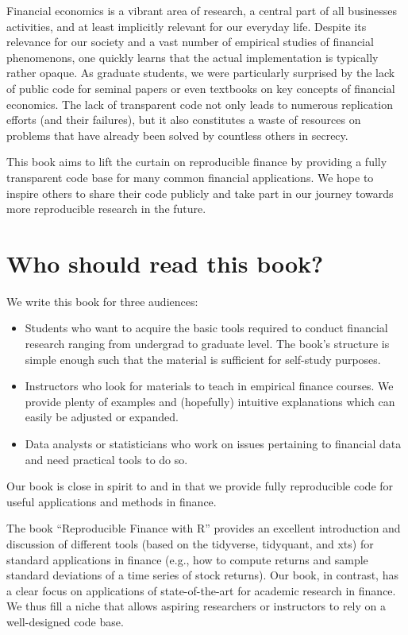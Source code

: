 \documentclass[
]{krantz}
\providecommand{\tightlist}{%
  \setlength{\itemsep}{0pt}\setlength{\parskip}{0pt}}
\begin{document}
Financial economics is a vibrant area of research, a central part of all businesses activities, and at least implicitly relevant for our everyday life. Despite its relevance for our society and a vast number of empirical studies of financial phenomenons, one quickly learns that the actual implementation is typically rather opaque.
As graduate students, we were particularly surprised by the lack of public code for seminal papers or even textbooks on key concepts of financial economics. The lack of transparent code not only leads to numerous replication efforts (and their failures), but it also constitutes a waste of resources on problems that have already been solved by countless others in secrecy.

This book aims to lift the curtain on reproducible finance by providing a fully transparent code base for many common financial applications. We hope to inspire others to share their code publicly and take part in our journey towards more reproducible research in the future.

\hypertarget{who-should-read-this-book}{%
\section*{Who should read this book?}\label{who-should-read-this-book}}


We write this book for three audiences:

\begin{itemize}
\tightlist
\item
  Students who want to acquire the basic tools required to conduct financial research ranging from undergrad to graduate level. The book's structure is simple enough such that the material is sufficient for self-study purposes.
\item
  Instructors who look for materials to teach in empirical finance courses. We provide plenty of examples and (hopefully) intuitive explanations which can easily be adjusted or expanded.\\
\item
  Data analysts or statisticians who work on issues pertaining to financial data and need practical tools to do so.
\end{itemize}

Our book is close in spirit to \citet{Regenstein2018} and \citet{Coqueret2020} in that we provide fully reproducible code for useful applications and methods in finance.

The book ``Reproducible Finance with R'' provides an excellent introduction and discussion of different tools (based on the tidyverse, tidyquant, and xts) for standard applications in finance (e.g., how to compute returns and sample standard deviations of a time series of stock returns). Our book, in contrast, has a clear focus on applications of state-of-the-art for academic research in finance. We thus fill a niche that allows aspiring researchers or instructors to rely on a well-designed code base.
\end{document}
